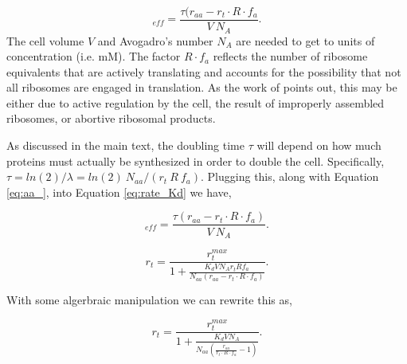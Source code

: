 \begin{equation}
[AA]_{eff} =  \frac{\tau (r_{aa} - r_t \cdot R \cdot f_a }{V \ N_A}.
\label{eq:aa_}
\end{equation}
The cell volume $V$ and Avogadro's number $N_A$ are needed to get to units of
concentration (i.e. mM). The factor $R \cdot f_a$ reflects the number of
ribosome equivalents that are actively translating and accounts for the
possibility that not all ribosomes are engaged in translation. As the work of
\citep{dai2016} points out, this may be either due to active regulation by the
cell, the result of improperly assembled ribosomes, or abortive ribosomal
products.

As discussed in the main text, the doubling time $\tau$ will depend on how much proteins
must actually be synthesized in order to double the cell. Specifically, $\tau = ln(2)/\lambda =
ln(2) \ N_{aa} / (r_t \ R \ f_a)$. Plugging this, along with Equation \ref{eq:aa_}, into Equation \ref{eq:rate_Kd} we have,

\begin{equation}
[AA]_{eff} =  \frac{\tau (r_{aa} - r_t \cdot R \cdot f_a)}{V \ N_A}.
\label{eq:aa_}
\end{equation}

\begin{equation}
r_t = \frac{r_t^{max}}{1 + \frac{K_d V N_A r_t R f_a}{N_{aa} (r_{aa} - r_t \cdot R \cdot f_a)}}.
\label{eq:rate_Kd_full}
\end{equation}


With some algerbraic manipulation we can rewrite this as,

\begin{equation}
r_t =  \frac{r_t^{max}}{1 + \frac{K_d V N_A }{N_{aa} (\frac{r_{aa}}{r_t \cdot R \cdot f_a} - 1)}}.
\label{eq:rate_Kd_full2}
\end{equation}

